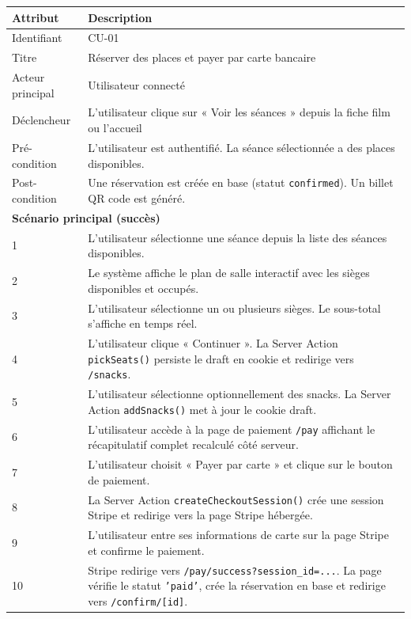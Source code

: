 \documentclass[12pt,a4paper,openany]{report}
\begin{document}
\begin{table}[H]
\centering
\begin{tabularx}{\textwidth}{lX}
\toprule
\textbf{Attribut} & \textbf{Description} \\
\midrule
Identifiant        & CU-01 \\
Titre              & Réserver des places et payer par carte bancaire \\
Acteur principal   & Utilisateur connecté \\
Déclencheur        & L'utilisateur clique sur « Voir les séances » depuis la fiche film ou l'accueil \\
Pré-condition      & L'utilisateur est authentifié. La séance sélectionnée a des places disponibles. \\
Post-condition     & Une réservation est créée en base (statut \texttt{confirmed}). Un billet QR code est généré. \\
\midrule
\multicolumn{2}{l}{\textbf{Scénario principal (succès)}} \\
\midrule
1 & L'utilisateur sélectionne une séance depuis la liste des séances disponibles. \\
2 & Le système affiche le plan de salle interactif avec les sièges disponibles et occupés. \\
3 & L'utilisateur sélectionne un ou plusieurs sièges. Le sous-total s'affiche en temps réel. \\
4 & L'utilisateur clique « Continuer ». La Server Action \texttt{pickSeats()} persiste le draft en cookie et redirige vers \texttt{/snacks}. \\
5 & L'utilisateur sélectionne optionnellement des snacks. La Server Action \texttt{addSnacks()} met à jour le cookie draft. \\
6 & L'utilisateur accède à la page de paiement \texttt{/pay} affichant le récapitulatif complet recalculé côté serveur. \\
7 & L'utilisateur choisit « Payer par carte » et clique sur le bouton de paiement. \\
8 & La Server Action \texttt{createCheckoutSession()} crée une session Stripe et redirige vers la page Stripe hébergée. \\
9 & L'utilisateur entre ses informations de carte sur la page Stripe et confirme le paiement. \\
10 & Stripe redirige vers \texttt{/pay/success?session\_id=...}. La page vérifie le statut \texttt{'paid'}, crée la réservation en base et redirige vers \texttt{/confirm/[id]}. \\

\end{tabularx}
\end{table}
\end{document}
